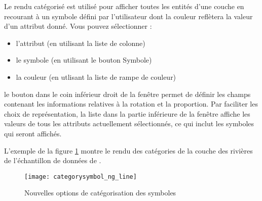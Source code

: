 
Le rendu catégorisé est utilisé pour afficher toutes les entités d'une couche en recourant à un symbole défini par l'utilisateur dont la couleur reflètera la valeur d'un attribut donné. Vous pouvez sélectionner :

\begin{itemize}[label=--]
\item l'attribut (en utilisant la liste de colonne)
\item le symbole (en utilisant le bouton Symbole)
\item la couleur (en utlisant la liste de rampe de couleur)
\end{itemize}

le bouton  dans le coin inférieur droit de la fenêtre permet de définir les champs contenant les informations relatives à la rotation et la proportion.
Par faciliter les choix de représentation, la liste dans la partie inférieure de la fenêtre affiche les valeurs de tous les attributs actuellement sélectionnés, ce qui inclut les symboles qui seront affichés.

L'exemple de la figure \ref{fig:catsymNG} montre le rendu des catégories de la couche des rivières de l'échantillon de données de \qg.

\begin{figure}[ht]
   \centering
   \caption{Nouvelles options de catégorisation des symboles \nixcaption}\label{fig:catsymNG}
   \texttt{[image: categorysymbol\_ng\_line]}
\end{figure}

